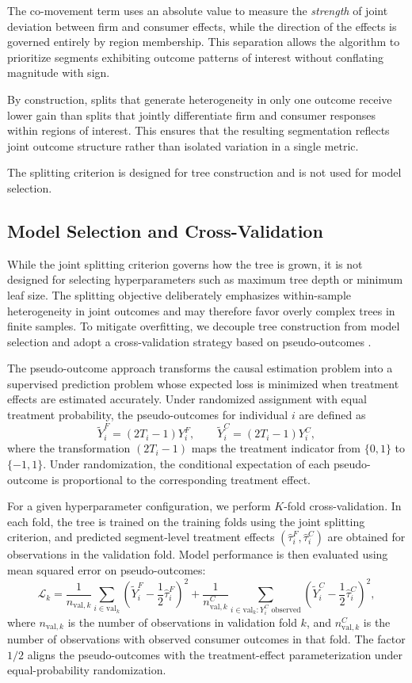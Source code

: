 \documentclass[11pt,letterpaper,english]{article}
\theoremstyle{definition}
\theoremstyle{definition}
\begin{document}
\begin{bibunit}
The co-movement term uses an absolute value to measure the \emph{strength} of joint deviation between firm and consumer effects, while the direction of the effects is governed entirely by region membership. This separation allows the algorithm to prioritize segments exhibiting outcome patterns of interest without conflating magnitude with sign.


By construction, splits that generate heterogeneity in only one outcome receive lower gain than splits that jointly differentiate firm and consumer responses within regions of interest. This ensures that the resulting segmentation reflects joint outcome structure rather than isolated variation in a single metric.

The splitting criterion is designed for tree construction and is not used for model selection.

\subsection{Model Selection and Cross-Validation}
\label{sec:model-selection}

While the joint splitting criterion governs how the tree is grown, it is not designed for selecting hyperparameters such as maximum tree depth or minimum leaf size. The splitting objective deliberately emphasizes within-sample heterogeneity in joint outcomes and may therefore favor overly complex trees in finite samples. To mitigate overfitting, we decouple tree construction from model selection and adopt a cross-validation strategy based on pseudo-outcomes \citep{wager2018estimation}.

The pseudo-outcome approach transforms the causal estimation problem into a supervised prediction problem whose expected loss is minimized when treatment effects are estimated accurately. Under randomized assignment with equal treatment probability, the pseudo-outcomes for individual $i$ are defined as
\[
\tilde{Y}^F_i = (2T_i - 1) Y^F_i, \qquad
\tilde{Y}^C_i = (2T_i - 1) Y^C_i,
\]
where the transformation $(2T_i - 1)$ maps the treatment indicator from $\{0,1\}$ to $\{-1,1\}$. Under randomization, the conditional expectation of each pseudo-outcome is proportional to the corresponding treatment effect.

For a given hyperparameter configuration, we perform $K$-fold cross-validation. In each fold, the tree is trained on the training folds using the joint splitting criterion, and predicted segment-level treatment effects $(\hat{\tau}^F_i, \hat{\tau}^C_i)$ are obtained for observations in the validation fold. Model performance is then evaluated using mean squared error on pseudo-outcomes:
\[
\mathcal{L}_k
=
\frac{1}{n_{\text{val},k}} \sum_{i \in \text{val}_k}
\left( \tilde{Y}^F_i - \frac{1}{2}\hat{\tau}^F_i \right)^2
+
\frac{1}{n_{\text{val},k}^C} \sum_{i \in \text{val}_k : Y_i^C \text{ observed}}
\left( \tilde{Y}^C_i - \frac{1}{2}\hat{\tau}^C_i \right)^2,
\]
where $n_{\text{val},k}$ is the number of observations in validation fold $k$, and $n_{\text{val},k}^C$ is the number of observations with observed consumer outcomes in that fold. The factor $1/2$ aligns the pseudo-outcomes with the treatment-effect parameterization under equal-probability randomization.


\end{bibunit}
\end{document}
